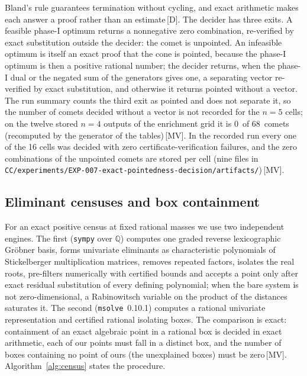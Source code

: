 \documentclass[11pt]{article}
\theoremstyle{definition}
\theoremstyle{remark}
\newcommand{\numFarkasOnly}{0}
\newcommand{\numFarkasTotal}{68}
\newcommand{\mk}[1]{\,{\scriptsize[#1]}}
\newcommand{\MV}{\mk{MV}}
\newcommand{\Dm}{\mk{D}}
\begin{document}
Bland's rule guarantees termination without cycling, and exact arithmetic makes each answer a proof
rather than an estimate\Dm. The decider has three exits. A feasible phase-I optimum returns a nonnegative zero combination, re-verified by exact
substitution outside the decider: the comet is unpointed. An infeasible optimum is itself an exact proof that the cone is pointed, because the
phase-I optimum is then a positive rational number; the decider returns, when the phase-I dual or the negated sum of the generators gives one, a
separating vector re-verified by exact substitution, and otherwise it returns pointed without a vector. The run summary counts the third exit as
pointed and does not separate it, so the number of comets decided without a vector is not recorded for the $n=5$ cells; on the twelve stored
$n=4$ outputs of the enrichment grid it is \numFarkasOnly\ of \numFarkasTotal\ comets (recomputed by the generator of the tables)\MV. In the recorded run
every one of the 16 cells was decided with zero certificate-verification failures, and the zero combinations of the unpointed comets are stored per
cell (nine files in \texttt{CC/experiments/EXP-007-exact-pointedness-decision/artifacts/})\MV.

\subsection{Eliminant censuses and box containment}

For an exact positive census at fixed rational masses we use two independent engines.
The first (\texttt{sympy} over $\mathbb{Q}$) computes one graded reverse lexicographic
Gr\"obner basis, forms univariate eliminants as characteristic polynomials of Stickelberger
multiplication matrices, removes repeated factors, isolates the real roots, pre-filters
numerically with certified bounds and accepts a point only after exact residual substitution of
every defining polynomial; when the bare system is not zero-dimensional, a Rabinowitsch variable
on the product of the distances saturates it. The second (\texttt{msolve}~0.10.1) computes a
rational univariate representation and certified rational isolating boxes. The comparison is
exact: containment of an exact algebraic point in a rational box is decided in exact arithmetic,
each of our points must fall in a distinct box, and the number of boxes containing no point of
ours (the unexplained boxes) must be zero\MV. Algorithm~\ref{alg:census} states the procedure.
\end{document}
